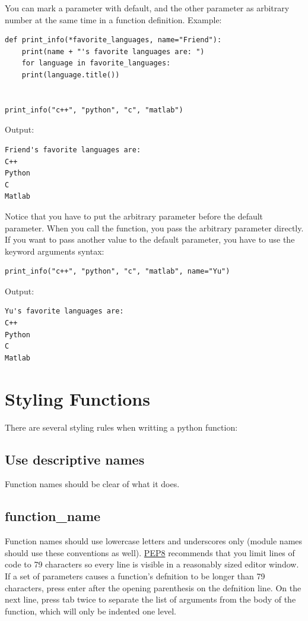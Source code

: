 \documentclass[12pt]{book}
\begin{document}
You can mark a parameter with default, and the other parameter as arbitrary number at the same time in a function definition. Example:
\begin{verbatim}
def print_info(*favorite_languages, name="Friend"):
    print(name + "'s favorite languages are: ")
    for language in favorite_languages:
	print(language.title())


print_info("c++", "python", "c", "matlab")
\end{verbatim}
Output:
\begin{verbatim}
Friend's favorite languages are: 
C++
Python
C
Matlab
\end{verbatim}
Notice that you have to put the arbitrary parameter before the default parameter. When you call the function, you pass the arbitrary parameter directly. If you want to pass another value to the default parameter, you have to use the keyword arguments syntax:
\begin{verbatim}
print_info("c++", "python", "c", "matlab", name="Yu")
\end{verbatim}
Output:
\begin{verbatim}
Yu's favorite languages are: 
C++
Python
C
Matlab
\end{verbatim}

\section{Styling Functions}
\label{sec:org4040b7d}
There are several styling rules when writting a python function:

\subsection{Use descriptive names}
\label{sec:org8302bf4}
Function names should be clear of what it does.

\subsection{function\_name}
\label{sec:org2c1f9ca}
Function names should use lowercase letters and underscores only (module names should use these conventions as well). \href{https://www.python.org/dev/peps/pep-0008/}{PEP8} recommends that you limit lines of code to 79 characters so every line is visible in a reasonably sized editor window. If a set of parameters causes a function’s defnition to be longer than 79 characters, press enter after the opening parenthesis on the defnition line. On the next line, press tab twice to separate the list of arguments from the body of the function, which will only be indented one level.
\end{document}
